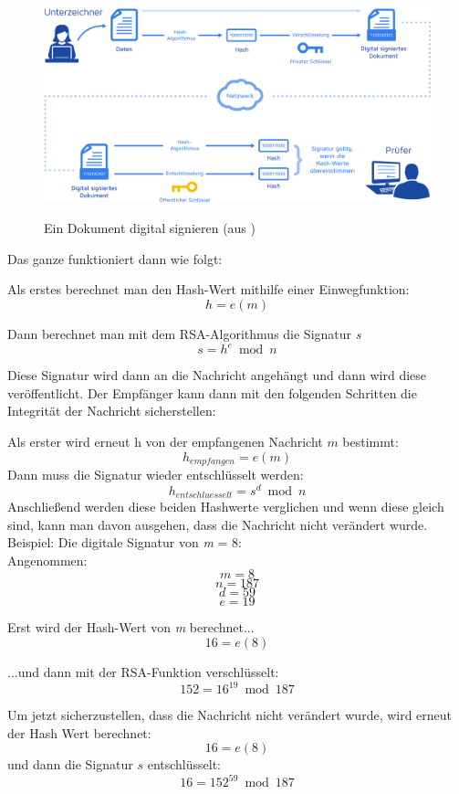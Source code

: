 \documentclass[12pt,a4paper]{scrartcl}
\begin{document}
\begin{figure}
\includegraphics[scale=0.45]{Dokument_digitale_Signatur} \\
\caption{Ein Dokument digital signieren (aus \cite{digitalsignature})}
\label{fig:figure3}
\end{figure}

Das ganze funktioniert dann wie folgt:

Als erstes berechnet man den Hash-Wert mithilfe einer Einwegfunktion:
$$ {h = e(m)} $$

Dann berechnet man mit dem RSA-Algorithmus die Signatur \textit{s}
$$ {s = h^e \bmod n} $$

Diese Signatur wird dann an die Nachricht angehängt und dann wird diese veröffentlicht.
Der Empfänger kann dann mit den folgenden Schritten die Integrität der Nachricht sicherstellen:

Als erster wird erneut h von der empfangenen Nachricht $m$ bestimmt:
$${h_{empfangen} = e(m) }$$
Dann muss die Signatur wieder entschlüsselt werden:
$$ {h_{entschluesselt} = s^d \bmod n} $$
Anschließend werden diese beiden Hashwerte verglichen und wenn diese gleich sind, kann man davon ausgehen, dass die Nachricht nicht verändert wurde. \\


Beispiel: Die digitale Signatur von \textit{m} = 8:\\ 
Angenommen:
$${ \textit{m} = 8 }$$
$${ \textit{n} = 187 }$$
$${ \textit{d} = 59 }$$
$${ \textit{e} = 19 }$$


Erst wird der Hash-Wert von \textit{m} berechnet...
$$ {16 = e(8)} $$	

...und dann mit der RSA-Funktion verschlüsselt: %
$$ {152 = 16^19 \bmod 187} $$	

Um jetzt sicherzustellen, dass die Nachricht nicht verändert wurde, wird erneut der Hash Wert berechnet:
$$ {16 = e(8)} $$	
und dann die Signatur $s$ entschlüsselt:
$$ {16 = 152^59 \bmod 187} $$
\end{document}
